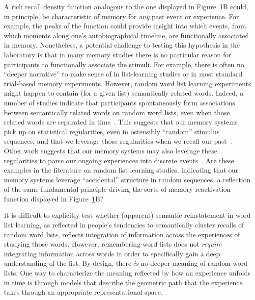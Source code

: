 \documentclass{article}
\begin{document}
\begin{figure}[tp]
\label{fig:reinstatement}
\end{figure}

A rich recall density function analogous to the one displayed in Figure~\ref{fig:reinstatement}B could, in principle, be characteristic of memory for \textit{any} past event or experience.  For example, the peaks of the function could provide insight into which events, from which moments along one's autobiographical timeline, are functionally associated in memory.  Nonetheless, a potential challenge to testing this hypothesis in the laboratory is that in many memory studies there is no particular reason for participants to functionally associate the stimuli.  For example, there is often no ``deeper narrative'' to make sense of in list-learning studies or in most standard trial-based memory experiments.  However, random word list learning experiments might happen to contain (for a given list) semantically related words.  Indeed, a number of studies indicate that participants spontaneously form associations between semantically related words on random word lists, even when those related words are separated in time~\citep[e.g.,][]{WixtRohr94, MannKaha12, MannEtal12}.  This suggests that our memory systems pick up on statistical regularities, even in ostensibly ``random'' stimulus sequences, and that we leverage those regularities when we recall our past~\citep{PolyEtal09}.  Other work suggests that our memory systems may also leverage these regularities to parse our ongoing experiences into discrete events~\citep{SchaEtal13}.  Are these examples in the literature on random list learning studies, indicating that our memory systems leverage ``accidental'' structure in random sequences, a reflection of the same fundamental principle driving the sorts of memory reactivation function displayed in Figure~\ref{fig:reinstatement}B?

It is difficult to explicitly test whether (apparent) semantic reinstatement in word list learning, as reflected in people's tendencies to semantically cluster recalls of random word lists, reflects integration of information across the experiences of studying those words.  However, remembering word lists does not \textit{require} integrating information across words in order to specifically gain a deep understanding of the list.  By design, there \textit{is} no deeper meaning of random word lists.  One way to characterize the meaning reflected by how an experience unfolds in time is through models that describe the geometric path that the experience takes through an appropriate representational space.
\end{document}
